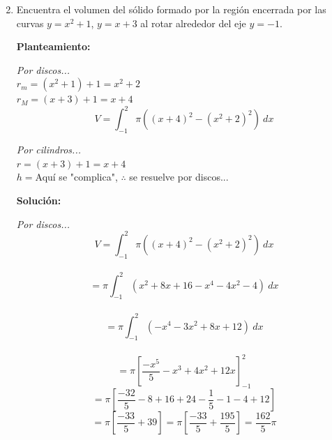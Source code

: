 \documentclass[10pt,letterpaper]{article}
\begin{document}
\begin{enumerate}
\begin{multicols}{2}
\end{multicols}

\item Encuentra el volumen del sólido formado por la región encerrada por las curvas $y=x^2 +1$,
      $y=x+3$ al rotar alrededor del eje $y = -1$.

\begin{multicols}{2}


\textbf{Planteamiento:}

\textit{Por discos...} \\
$r_m = (x^2 + 1) + 1 = x^2 + 2$ \\
$r_M = (x + 3) + 1 = x + 4$
$$V = \int_{-1}^{2} \pi ( (x+4)^2 - (x^2 + 2)^2 ) \ dx$$

\textit{Por cilindros...} \\
$r = (x+3)+1 = x+4$ \\
$h = $Aquí se "complica", $\therefore$ se resuelve por discos...

\textbf{Solución:}

\textit{Por discos...}
$$V = \int_{-1}^{2} \pi ( (x+4)^2 - (x^2 + 2)^2 ) \ dx$$ \\
$$= \pi \int_{-1}^{2} (x^2 + 8x + 16 - x^4 - 4x^2 -4) \ dx$$ \\
$$= \pi \int_{-1}^{2} (-x^4 -3x^2 + 8x + 12)\ dx$$ \\
$$= \pi [\frac{-x^5}{5} - x^3 + 4x^2 + 12x]_{-1}^{2}$$
$$= \pi [\frac{-32}{5} - 8 + 16 + 24 - \frac{1}{5} - 1 - 4  + 12]$$
$$= \pi [\frac{-33}{5}+39] = \pi [\frac{-33}{5} + \frac{195}{5}] = \frac{162}{5}\pi$$


\end{multicols}
\end{enumerate}
\end{document}
